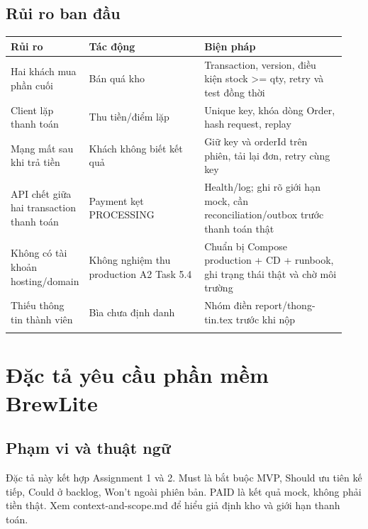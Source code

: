 \documentclass[a4paper,12pt,oneside]{report}
\begin{document}
\subsection{Rủi ro ban đầu}
\begingroup\fontsize{9}{11}\selectfont\setlength{\tabcolsep}{3pt}\renewcommand{\arraystretch}{1.35}
\begin{longtable}{@{}>{\raggedright\arraybackslash}p{0.14\linewidth} >{\raggedright\arraybackslash}p{0.36\linewidth} >{\raggedright\arraybackslash}p{0.44\linewidth}@{}}
\toprule
\textbf{Rủi ro} & \textbf{Tác động} & \textbf{Biện pháp} \\
\midrule\endhead
Hai khách mua phần cuối & Bán quá kho & Transaction, version, điều kiện stock >= qty, retry và test đồng thời \\
\addlinespace[2pt]
Client lặp thanh toán & Thu tiền/\allowbreak{}điểm lặp & Unique key, khóa dòng Order, hash request, replay \\
\addlinespace[2pt]
Mạng mất sau khi trả tiền & Khách không biết kết quả & Giữ key và orderId trên phiên, tải lại đơn, retry cùng key \\
\addlinespace[2pt]
API chết giữa hai transaction thanh toán & Payment kẹt PROCESSING & Health/\allowbreak{}log; ghi rõ giới hạn mock, cần reconciliation/\allowbreak{}outbox trước thanh toán thật \\
\addlinespace[2pt]
Không có tài khoản hosting/\allowbreak{}domain & Không nghiệm thu production A2 Task 5.4 & Chuẩn bị Compose production + CD + runbook, ghi trạng thái thật và chờ môi trường \\
\addlinespace[2pt]
Thiếu thông tin thành viên & Bìa chưa định danh & Nhóm điền {\small\ttfamily report/\allowbreak{}thong-\allowbreak{}tin.\allowbreak{}tex} trước khi nộp \\
\addlinespace[2pt]
\bottomrule\end{longtable}\endgroup

\section{Đặc tả yêu cầu phần mềm BrewLite}

\subsection{Phạm vi và thuật ngữ}
Đặc tả này kết hợp Assignment 1 và 2. Must là bắt buộc MVP, Should ưu tiên kế tiếp, Could ở backlog, Won’t ngoài phiên bản. PAID là kết quả mock, không phải tiền thật. Xem {\small\ttfamily context-\allowbreak{}and-\allowbreak{}scope.\allowbreak{}md} để hiểu giả định kho và giới hạn thanh toán.
\end{document}
